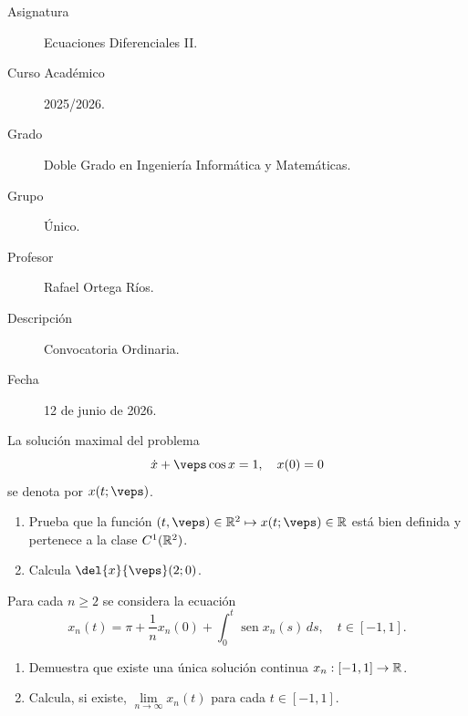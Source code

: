 \documentclass[12pt]{article}
\begin{document}

    
    

    \begin{description}
        \item[Asignatura] Ecuaciones Diferenciales II.
        \item[Curso Académico] 2025/2026.
        \item[Grado] Doble Grado en Ingeniería Informática y Matemáticas.
        \item[Grupo] Único.
        \item[Profesor] Rafael Ortega Ríos.
        \item[Descripción] Convocatoria Ordinaria.
        \item[Fecha] 12 de junio de 2026.
    
    \end{description}
    \newpage


    
    \begin{ejercicio}
        La solución maximal del problema
        \[ \dot{x} + \veps \cos x = 1, \quad x(0) = 0 \]
        se denota por $x(t; \veps)$.
        \begin{enumerate}[label=\alph*)]
            \item Prueba que la función $(t, \veps) \in \bb{R}^2 \mapsto x(t; \veps) \in \bb{R}$ está bien definida y pertenece a la clase $C^1(\mathbb{R}^2)$.
            \item Calcula $\displaystyle \del{x}{\veps}(2; 0)$.
        \end{enumerate}
    \end{ejercicio}

    \begin{ejercicio}
        Para cada $n \geq 2$ se considera la ecuación
        \[ x_n(t) = \pi + \frac{1}{n} x_n(0) + \int_0^t \operatorname{sen} x_n(s) \, ds, \quad t \in [-1, 1]. \]
        \begin{enumerate}[label=\alph*)]
            \item Demuestra que existe una única solución continua $x_n : [-1, 1] \to \mathbb{R}$.
            \item Calcula, si existe, $\lim\limits_{n \to \infty} x_n(t)$ para cada $t \in [-1, 1]$.
        \end{enumerate}
    \end{ejercicio}
\end{document}

